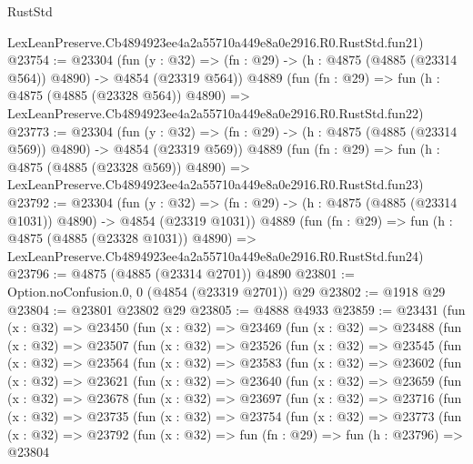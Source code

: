 \begin{lexlean}{RustStd}
\begin{coremodule}
    LexLeanPreserve.Cb4894923ee4a2a55710a449e8a0e2916.R0.RustStd.fun21)
@23754 := @23304
    (fun (y : @32) => (fn : @29) -> (h : @4875 (@4885 (@23314 @564)) @4890) -> @4854 (@23319 @564))
    @4889
    (fun (fn : @29) =>
    fun (h : @4875 (@4885 (@23328 @564)) @4890) =>
    LexLeanPreserve.Cb4894923ee4a2a55710a449e8a0e2916.R0.RustStd.fun22)
@23773 := @23304
    (fun (y : @32) => (fn : @29) -> (h : @4875 (@4885 (@23314 @569)) @4890) -> @4854 (@23319 @569))
    @4889
    (fun (fn : @29) =>
    fun (h : @4875 (@4885 (@23328 @569)) @4890) =>
    LexLeanPreserve.Cb4894923ee4a2a55710a449e8a0e2916.R0.RustStd.fun23)
@23792 := @23304
    (fun (y : @32) =>
    (fn : @29) -> (h : @4875 (@4885 (@23314 @1031)) @4890) -> @4854 (@23319 @1031))
    @4889
    (fun (fn : @29) =>
    fun (h : @4875 (@4885 (@23328 @1031)) @4890) =>
    LexLeanPreserve.Cb4894923ee4a2a55710a449e8a0e2916.R0.RustStd.fun24)
@23796 := @4875 (@4885 (@23314 @2701)) @4890
@23801 := Option.noConfusion.{0, 0} (@4854 (@23319 @2701)) @29
@23802 := @1918 @29
@23804 := @23801 @23802 @29
@23805 := @4888 @4933
@23859 := @23431
    (fun (x : @32) =>
    @23450
      (fun (x : @32) =>
      @23469
        (fun (x : @32) =>
        @23488
          (fun (x : @32) =>
          @23507
            (fun (x : @32) =>
            @23526
              (fun (x : @32) =>
              @23545
                (fun (x : @32) =>
                @23564
                  (fun (x : @32) =>
                  @23583
                    (fun (x : @32) =>
                    @23602
                      (fun (x : @32) =>
                      @23621
                        (fun (x : @32) =>
                        @23640
                          (fun (x : @32) =>
                          @23659
                            (fun (x : @32) =>
                            @23678
                              (fun (x : @32) =>
                              @23697
                                (fun (x : @32) =>
                                @23716
                                  (fun (x : @32) =>
                                  @23735
                                    (fun (x : @32) =>
                                    @23754
                                      (fun (x : @32) =>
                                      @23773
                                        (fun (x : @32) =>
                                        @23792
                                          (fun (x : @32) =>
                                          fun (fn : @29) =>
                                          fun (h : @23796) =>
                                          @23804

\end{coremodule}
\end{lexlean}
